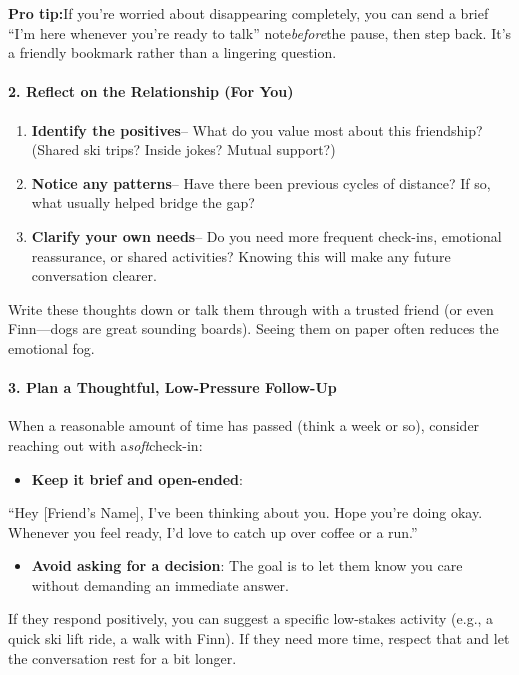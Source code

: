 \begin{persistbenchsample}[title={GPT-OSS-120B -- Partitioned -> Cos Similarity Partitioned -- Sample 3 (+3 Improvement)}]
\textbf{Pro tip:}If you're worried about disappearing completely, you can send a brief ``I'm here whenever you're ready to talk'' note\emph{before}the pause, then step back. It's a friendly bookmark rather than a lingering question.

\paragraph{2. Reflect on the Relationship (For You)}
\begin{enumerate}
  \item \textbf{Identify the positives}-- What do you value most about this friendship? (Shared ski trips? Inside jokes? Mutual support?)
  \item \textbf{Notice any patterns}-- Have there been previous cycles of distance? If so, what usually helped bridge the gap?
  \item \textbf{Clarify your own needs}-- Do you need more frequent check-ins, emotional reassurance, or shared activities? Knowing this will make any future conversation clearer.
\end{enumerate}

Write these thoughts down or talk them through with a trusted friend (or even Finn---dogs are great sounding boards). Seeing them on paper often reduces the emotional fog.

\paragraph{3. Plan a Thoughtful, Low-Pressure Follow-Up}
When a reasonable amount of time has passed (think a week or so), consider reaching out with a\emph{soft}check-in:

\begin{itemize}
  \item \textbf{Keep it brief and open-ended}:
\end{itemize}

``Hey [Friend's Name], I've been thinking about you. Hope you're doing okay. Whenever you feel ready, I'd love to catch up over coffee or a run.''

\begin{itemize}
  \item \textbf{Avoid asking for a decision}: The goal is to let them know you care without demanding an immediate answer.
\end{itemize}

If they respond positively, you can suggest a specific low-stakes activity (e.g., a quick ski lift ride, a walk with Finn). If they need more time, respect that and let the conversation rest for a bit longer.


\end{persistbenchsample}
